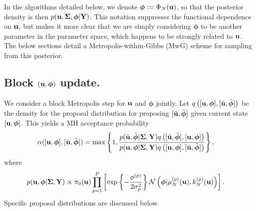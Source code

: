 \documentclass[12pt]{article}
\newcommand{\bphi}{\boldsymbol{\phi}}
\begin{document}
In the algorithms detailed below, we denote $\bphi := \indexDesign[\Ndesign]{\SSR}(\bpar)$, so that the posterior density is then $p(\bpar, \CovObs, \bphi | \stateMat)$. This notation suppresses 
the functional dependence on $\mathbf{u}$, but makes it more clear that we are simply considering $\bphi$ to be another parameter in the parameter space, which happens to be strongly 
related to $\mathbf{u}$. The below sections detail a Metropolis-within-Gibbs (MwG) scheme for sampling from this posterior. 

\subsection{Block $(\bpar, \bphi)$ update.}
We consider a block Metropolis step for $\mathbf{u}$ and $\bphi$ jointly. Let $\propDens\left([\bpar, \bphi], [\tilde{\bpar}, \tilde{\bphi}] \right)$ be the density for the proposal distribution for 
proposing $[\tilde{\bpar}, \tilde{\bphi}]$ given current state $[\bpar, \bphi]$. This yields a MH acceptance probability
\begin{align*}
\accProbMH([\bpar, \bphi], [\tilde{\bpar}, \tilde{\bphi}]) 
&= \max\left\{1,  \frac{p(\tilde{\bpar}, \tilde{\bphi}|\CovObs, \stateMat)\propDens\left([\tilde{\bpar}, \tilde{\bphi}], [\bpar, \bphi] \right)}{p(\bpar, \bphi|\CovObs, \stateMat) \propDens\left([\bpar, \bphi], [\tilde{\bpar}, \tilde{\bphi}] \right)} \right\},
\end{align*}
where 
\begin{align*}
p(\bpar, \bphi|\CovObs, \stateMat) 
&\propto \priorDens(\bpar) \prod_{\objIdx=1}^{\Nobj} \left[\exp\left\{-\frac{\indexObj{\phi}}{2\sdObs^2_{\objIdx}} \right\} 
\Gaussian\left(\bphi | \GPMeanPredOut{\Ndesign}{\objIdx}(\bpar), \GPKerPredOut{\Ndesign}{\objIdx}(\bpar)\right) \right].
\end{align*}
Specific proposal distributions are discussed below. 
\end{document}
